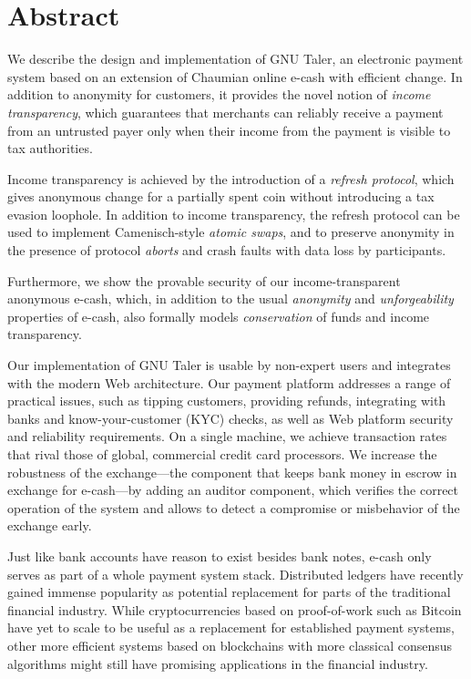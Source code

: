 \chapter{Abstract}
\begin{samepage}
We describe the design and implementation of GNU Taler, an electronic payment
system based on an extension of Chaumian online e-cash with efficient change.
In addition to anonymity for customers, it provides the novel notion of
\emph{income transparency}, which guarantees that merchants can reliably
receive a payment from an untrusted payer only when their income from the
payment is visible to tax authorities.

Income transparency is achieved by the introduction of a \emph{refresh
protocol}, which gives anonymous change for a partially spent coin without
introducing a tax evasion loophole.  In addition to income transparency, the
refresh protocol can be used to implement Camenisch-style \emph{atomic swaps}, and to
preserve anonymity in the presence of protocol \emph{aborts} and crash faults with
data loss by participants.

Furthermore, we show the provable security of our income-transparent anonymous
e-cash, which, in addition to the usual \emph{anonymity} and
\emph{unforgeability} properties of e-cash, also formally models
\emph{conservation} of funds and income transparency.

Our implementation of GNU Taler is usable by non-expert users and integrates
with the modern Web architecture.  Our payment platform addresses a range of
practical issues, such as tipping customers, providing refunds, integrating
with banks and know-your-customer (KYC) checks, as well as Web platform
security and reliability requirements.  On a single machine, we achieve
transaction rates that rival those of global, commercial credit card
processors.  We increase the robustness of the exchange---the component that
keeps bank money in escrow in exchange for e-cash---by adding an auditor
component, which verifies the correct operation of the system and allows to
detect a compromise or misbehavior of the exchange early.

Just like bank accounts have reason to exist besides bank notes, e-cash only
serves as part of a whole payment system stack.  Distributed ledgers have
recently gained immense popularity as potential replacement for parts of the
traditional financial industry.  While cryptocurrencies based on proof-of-work
such as Bitcoin have yet to scale to be useful as a replacement for established
payment systems, other more efficient systems based on blockchains with more
classical consensus algorithms might still have promising applications in the
financial industry.


\end{samepage}
